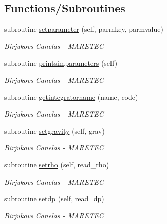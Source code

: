 \subsection*{Functions/\+Subroutines}
\begin{DoxyCompactItemize}
\item 
subroutine \mbox{\hyperlink{namespacesimulation__globals_aed3f671899558008ae9f0f009f581baf}{setparameter}} (self, parmkey, parmvalue)
\begin{DoxyCompactList}\small\item\em Birjukovs Canelas -\/ M\+A\+R\+E\+T\+EC \end{DoxyCompactList}\item 
subroutine \mbox{\hyperlink{namespacesimulation__globals_a0b17b2f2e9e7dbbad7c9d735217c1ee1}{printsimparameters}} (self)
\begin{DoxyCompactList}\small\item\em Birjukovs Canelas -\/ M\+A\+R\+E\+T\+EC \end{DoxyCompactList}\item 
subroutine \mbox{\hyperlink{namespacesimulation__globals_a2c6bf88542c503d1da58280ab3dcf772}{getintegratorname}} (name, code)
\begin{DoxyCompactList}\small\item\em Birjukovs Canelas -\/ M\+A\+R\+E\+T\+EC \end{DoxyCompactList}\item 
subroutine \mbox{\hyperlink{namespacesimulation__globals_ac655f60155581a71b312f3c1a8c87db2}{setgravity}} (self, grav)
\begin{DoxyCompactList}\small\item\em Birjukovs Canelas -\/ M\+A\+R\+E\+T\+EC \end{DoxyCompactList}\item 
subroutine \mbox{\hyperlink{namespacesimulation__globals_acfdc640757f0275bccb1d8de7bd7dc92}{setrho}} (self, read\+\_\+rho)
\begin{DoxyCompactList}\small\item\em Birjukovs Canelas -\/ M\+A\+R\+E\+T\+EC \end{DoxyCompactList}\item 
subroutine \mbox{\hyperlink{namespacesimulation__globals_a9a8e88c06937b7cf6be9d9bf30f54ba9}{setdp}} (self, read\+\_\+dp)
\begin{DoxyCompactList}\small\item\em Birjukovs Canelas -\/ M\+A\+R\+E\+T\+EC \end{DoxyCompactList}\item 

\end{DoxyCompactItemize}
